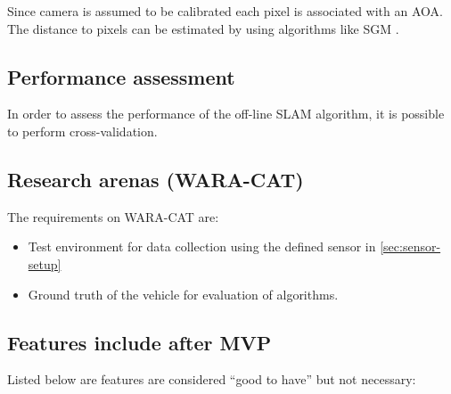 Since camera is assumed to be calibrated each pixel is associated with an \gls{AOA}. The distance to pixels can be estimated by using algorithms like SGM \cite{hirschmuller2005accurate}.



%


\subsection{Performance assessment}

In order to assess the performance of the off-line \gls{SLAM}
algorithm, it is possible to perform cross-validation.

\subsection{Research arenas (WARA-CAT)}


The requirements on WARA-CAT are:
\begin{itemize}
  \item Test environment for data collection using the defined sensor in
    \ref{sec:sensor-setup}
\item Ground truth of the vehicle for evaluation of algorithms.
\end{itemize}


\subsection{Features include after MVP}\label{sec:features}

Listed below are features are considered ``good to have'' but not
necessary:


